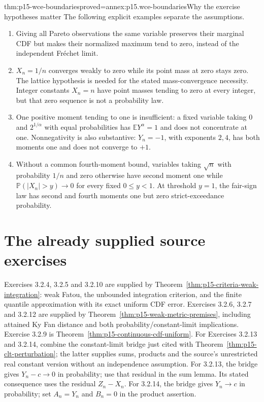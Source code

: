\begin{hbtheorem}{thm:p15-wce-boundaries}{proved=annex:p15.wce-boundaries}{Why the exercise hypotheses matter}
The following explicit examples separate the assumptions.
\begin{enumerate}
\item Giving all Pareto observations the same variable preserves their
 marginal CDF but makes their normalized maximum tend to zero,
 instead of the independent Fr\'echet limit.
\item \(X_n=1/n\) converges weakly to zero while its point
 mass at zero stays zero. The lattice hypothesis is needed
 for the stated mass-convergence necessity.
 Integer constants \(X_n=n\) have point masses tending to
 zero at every integer, but that zero sequence is not a probability law.
\item One positive moment tending to one is insufficient:
 a fixed variable taking \(0\) and \(2^{1/\alpha}\) with equal
 probabilities has \(\mathbb EY^\alpha=1\) and does not
 concentrate at one. Nonnegativity is also substantive:
 \(Y_n=-1\), with exponents \(2,4\), has both moments one
 and does not converge to \(+1\).
\item Without a common fourth-moment bound, variables taking
 \(\sqrt n\) with probability \(1/n\) and zero otherwise
 have second moment one while
 \(\mathbb P(|X_n|>y)\to0\) for every fixed \(0\leq y<1\).
 At threshold \(y=1\), the fair-sign law has second and
 fourth moments one but zero strict-exceedance probability.
\end{enumerate}
\end{hbtheorem}

\section{The already supplied source exercises}
\label{sec:p15-wce-existing-routes}

Exercises 3.2.4, 3.2.5 and 3.2.10 are supplied by
Theorem~\ref{thm:p15-criteria-weak-integration}: weak Fatou,
the unbounded integration criterion, and the finite quantile
approximation with its exact uniform CDF error.
Exercises 3.2.6, 3.2.7 and 3.2.12 are supplied by
Theorem~\ref{thm:p15-weak-metric-premises}, including attained
Ky Fan distance and both probability/constant-limit implications.
Exercise 3.2.9 is
Theorem~\ref{thm:p15-continuous-cdf-uniform}.
For Exercises 3.2.13 and 3.2.14, combine the constant-limit
bridge just cited with Theorem~\ref{thm:p15-clt-perturbation};
the latter supplies sums, products and the source's unrestricted
real constant version without an independence assumption.
For 3.2.13, the bridge gives \(Y_n-c\to0\) in probability;
use that residual in the sum lemma. Its stated consequence
uses the residual \(Z_n-X_n\).
For 3.2.14, the bridge gives \(Y_n\to c\) in probability;
set \(A_n=Y_n\) and \(B_n=0\) in the product assertion.

